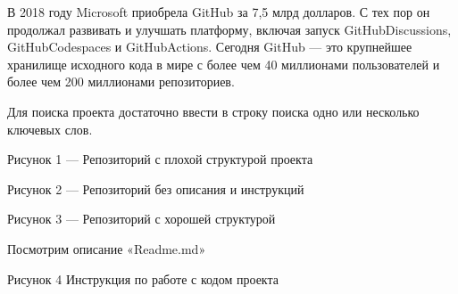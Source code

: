 \documentclass[letterpaper,10pt,russian]{sphinxmanual}
\begin{document}
\sphinxAtStartPar
В 2018 году Microsoft приобрела GitHub за 7,5 млрд долларов. С тех пор он продолжал развивать и улучшать платформу, включая запуск GitHubDiscussions, GitHubCodespaces и GitHubActions. Сегодня GitHub — это крупнейшее хранилище исходного кода в мире с более чем 40 миллионами пользователей и более чем 200 миллионами репозиториев.

\sphinxAtStartPar
Для поиска проекта достаточно ввести в строку поиска одно или несколько ключевых слов.

\sphinxAtStartPar
{}

\sphinxAtStartPar
Рисунок 1 — Репозиторий с плохой структурой проекта

\sphinxAtStartPar
{}
Рисунок 2 — Репозиторий без описания и инструкций

\sphinxAtStartPar
{}

\sphinxAtStartPar
Рисунок 3 — Репозиторий с хорошей структурой

\sphinxAtStartPar
Посмотрим описание «Readme.md»

\sphinxAtStartPar
{}

\sphinxAtStartPar
Рисунок 4 \textendash{} Инструкция по работе с кодом проекта
\end{document}
